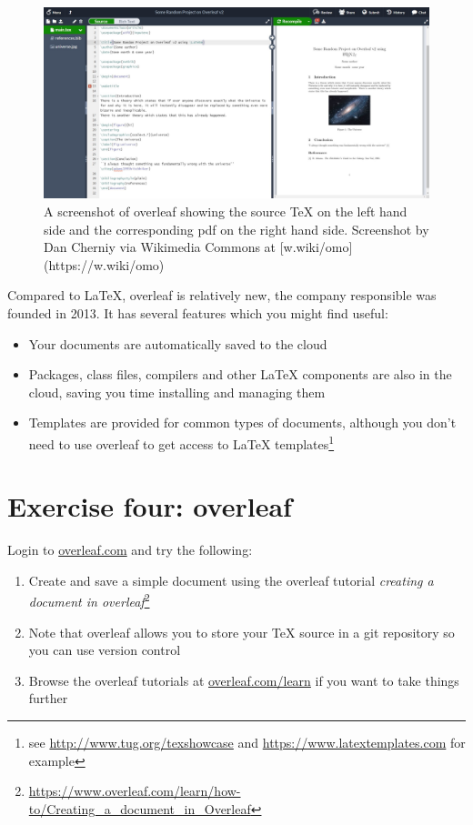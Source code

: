 \documentclass[
]{book}
\providecommand{\tightlist}{%
  \setlength{\itemsep}{0pt}\setlength{\parskip}{0pt}}
\begin{document}
\begin{figure}

{\centering \includegraphics[width=1\linewidth]{images/Overleaf_v2_editing_page} 

}

\caption{A screenshot of overleaf showing the source TeX on the left hand side and the corresponding pdf on the right hand side. Screenshot by Dan Cherniy via Wikimedia Commons at [w.wiki/omo](https://w.wiki/omo)}\label{fig:overleaf-fig}
\end{figure}

Compared to LaTeX, overleaf is relatively new, the company responsible was founded in 2013. It has several features which you might find useful:

\begin{itemize}
\tightlist
\item
  Your documents are automatically saved to the cloud
\item
  Packages, class files, compilers and other LaTeX components are also in the cloud, saving you time installing and managing them
\item
  Templates are provided for common types of documents, although you don't need to use overleaf to get access to LaTeX templates\footnote{see \url{http://www.tug.org/texshowcase} and \url{https://www.latextemplates.com} for example}
\end{itemize}

\hypertarget{ex4}{%
\section{Exercise four: overleaf}\label{ex4}}

Login to \href{https://www.overleaf.com/}{overleaf.com} and try the following:

\begin{enumerate}
\def\labelenumi{\arabic{enumi}.}
\tightlist
\item
  Create and save a simple document using the overleaf tutorial \emph{creating a document in overleaf}\footnote{\url{https://www.overleaf.com/learn/how-to/Creating_a_document_in_Overleaf}}~\\
\item
  Note that overleaf allows you to store your TeX source in a git repository so you can use version control
\item
  Browse the overleaf tutorials at \href{https://www.overleaf.com/learn}{overleaf.com/learn} if you want to take things further
\end{enumerate}
\end{document}
